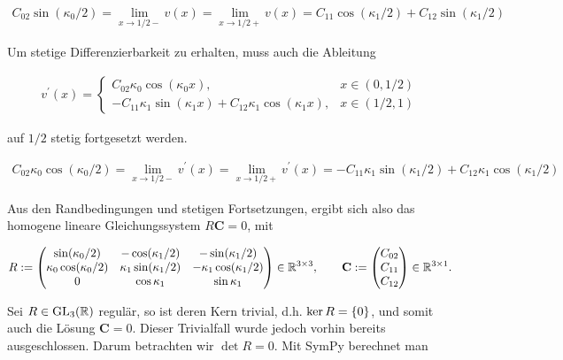 \begin{align*}
  C_{02} \sin(\kappa_0/2)
  = \lim_{x \to 1/2-} v(x)
  = \lim_{x \to 1/2+} v(x)
  = C_{11} \cos(\kappa_1/2) + C_{12} \sin(\kappa_1/2)
\end{align*}

Um stetige Differenzierbarkeit zu erhalten, muss auch die Ableitung

\begin{align*}
  v^\prime(x) =
  \begin{cases}
    C_{02} \kappa_0 \cos(\kappa_0 x),
    & x \in (0, 1/2) \\
    - C_{11} \kappa_1 \sin(\kappa_1 x) + C_{12} \kappa_1 \cos(\kappa_1 x),
    & x \in (1/2, 1)
  \end{cases}
\end{align*}

auf $1/2$ stetig fortgesetzt werden.

\begin{align*}
  C_{02} \kappa_0 \cos(\kappa_0/2)
  = \lim_{x \to 1/2-} v^\prime(x)
  = \lim_{x \to 1/2+} v^\prime(x)
  = - C_{11} \kappa_1 \sin(\kappa_1/2) + C_{12} \kappa_1 \cos(\kappa_1/2)
\end{align*}

Aus den Randbedingungen und stetigen Fortsetzungen, ergibt sich also das homogene lineare Gleichungssystem $R \mathbf{C} = 0$, mit

\begin{align*}
  R :=
  \begin{pmatrix}
    \sin(\kappa_0/2)          & -\cos(\kappa_1/2)         & -\sin(\kappa_1/2) \\
    \kappa_0 \cos(\kappa_0/2) & \kappa_1 \sin(\kappa_1/2) & - \kappa_1 \cos(\kappa_1/2) \\
    0                         & \cos{\kappa_1}            & \sin{\kappa_1}
  \end{pmatrix}
  \in \R^{3 \times 3}, \qquad
  \mathbf{C} :=
  \begin{pmatrix}
    C_{02} \\
    C_{11} \\
    C_{12}
  \end{pmatrix}
  \in \R^{3 \times 1}.
\end{align*}

Sei $R \in \GL[3]{\R}$ regulär, so ist deren Kern trivial, d.h. $\ker{R} = \Bbraces{0}$, und somit auch die Lösung $\mathbf{C} = 0$. Dieser Trivialfall wurde jedoch vorhin bereits ausgeschlossen. Darum betrachten wir $\det{R} = 0$. Mit SymPy berechnet man

